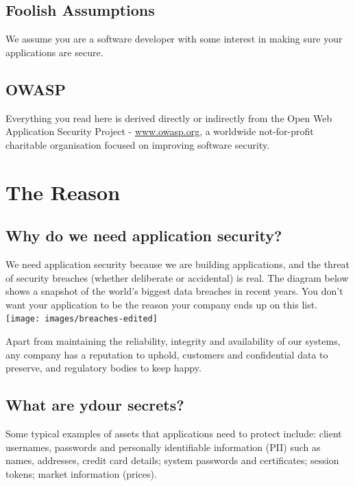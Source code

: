 \documentclass[a5paper,pagesize,10pt,bibtotoc,DIV=10,twoside]{scrbook}
\begin{document}
\section{Foolish Assumptions}
We assume you are a software developer with some interest in making sure your applications are secure. \\

\section{OWASP}

Everything you read here is derived directly or indirectly from the Open Web Application Security Project - \url{www.owasp.org}, a  worldwide not-for-profit charitable organisation focused on improving software security.\\

\chapter{The Reason}

\section{Why do we need application security?}

We need application security because we are building applications, and the threat of security breaches (whether deliberate or accidental) is real. The diagram\cite{breaches} below shows a snapshot of the world's biggest data breaches in recent years. You don't want your application to be the reason your company ends up on this list. \\

\texttt{[image: images/breaches-edited]}


Apart from maintaining the reliability, integrity and availability of our systems, any company has a reputation to uphold, customers and confidential data to preserve, and regulatory bodies to keep happy. 

\section{What are ydour secrets?}

Some typical examples of assets that applications need to protect include: client usernames, passwords and personally identifiable information (PII) such as names, addresses, credit card details; system passwords and certificates; session tokens; market information (prices).
\end{document}
